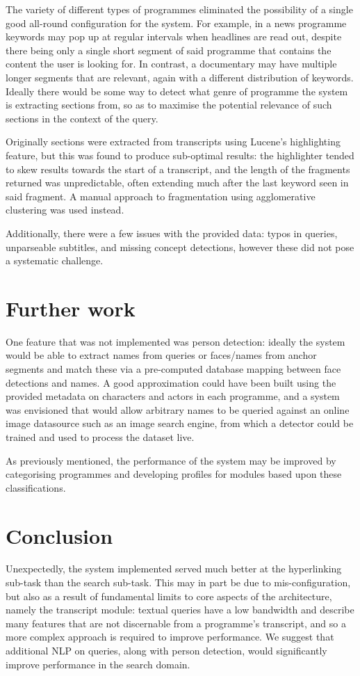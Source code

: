 \documentclass{../acm_proc_article-me11_tweaked}
\begin{document}
The variety of different types of programmes eliminated the possibility of a 
single good all-round configuration for the system. For example, in a news 
programme keywords may pop up at regular intervals when headlines are read 
out, despite there being only a single short segment of said programme that 
contains the content the user is looking for. In contrast, a documentary may 
have multiple longer segments that are relevant, again with a different 
distribution of keywords. Ideally there would be some way to detect what 
genre of programme the system is extracting sections from, so as to maximise 
the potential relevance of such sections in the context of the query.

Originally sections were extracted from transcripts using Lucene's 
highlighting feature, but this was found to produce sub-optimal results: the 
highlighter tended to skew results towards the start of a transcript, and the 
length of the fragments returned was unpredictable, often extending much after 
the last keyword seen in said fragment. A manual approach to fragmentation 
using agglomerative clustering was used instead.

Additionally, there were a few issues with the provided data: typos in 
queries, unparseable subtitles, and missing concept detections, however these 
did not pose a systematic challenge.

\section{Further work}
One feature that was not implemented was person detection: ideally the system 
would be able to extract names from queries or faces/names from anchor 
segments and match these via a pre-computed database mapping between face 
detections and names. A good approximation could have been built using the 
provided metadata on characters and actors in each programme, and a system was 
envisioned that would allow arbitrary names to be queried against an online 
image datasource such as an image search engine, from which a detector could 
be trained and used to process the dataset live.

As previously mentioned, the performance of the system may be improved by 
categorising programmes and developing profiles for modules based upon these 
classifications.

\section{Conclusion}
Unexpectedly, the system implemented served much better at the hyperlinking 
sub-task than the search sub-task. This may in part be due to 
mis-configuration, but also as a result of fundamental limits to core aspects 
of the architecture, namely the transcript module: textual queries have a low 
bandwidth and describe many features that are not discernable from a 
programme's transcript, and so a more complex approach is required to improve 
performance. We suggest that additional NLP on queries, along with person 
detection, would significantly improve performance in the search domain.
\end{document}
